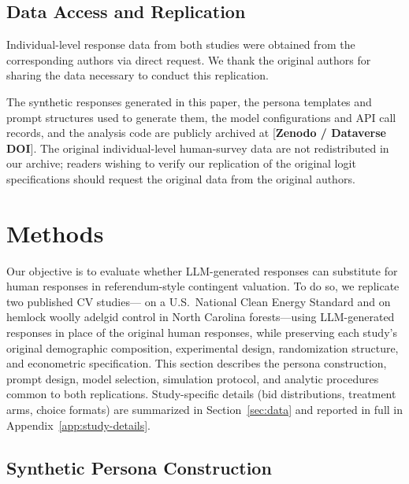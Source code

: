 \documentclass[12pt]{article}
\begin{document}
\subsection{Data Access and Replication}\label{sec:data-access}

Individual-level response data from both studies were obtained from the corresponding authors via direct request. We thank the original authors for sharing the
data necessary to conduct this replication.

The synthetic responses generated in this paper, the persona templates and
prompt structures used to generate them, the model configurations and API
call records, and the analysis code are publicly archived at
[\textbf{Zenodo / Dataverse DOI}]. The original individual-level
human-survey data are not redistributed in our archive; readers wishing
to verify our replication of the original logit specifications should
request the original data from the original authors.


%

\section{Methods}\label{sec:methods}

Our objective is to evaluate whether LLM-generated responses can substitute
for human responses in referendum-style contingent valuation. To do so, we
replicate two published CV studies---\textcite{Aldy2012} on a U.S.\ National
Clean Energy Standard and \textcite{Giguere2020} on hemlock woolly adelgid
control in North Carolina forests---using LLM-generated responses in place
of the original human responses, while preserving each study's original
demographic composition, experimental design, randomization structure, and
econometric specification. This section describes the persona construction,
prompt design, model selection, simulation protocol, and analytic procedures
common to both replications. Study-specific details (bid distributions,
treatment arms, choice formats) are summarized in Section~\ref{sec:data}
and reported in full in Appendix~\ref{app:study-details}.

\subsection{Synthetic Persona Construction}\label{sec:methods-persona}
\end{document}
